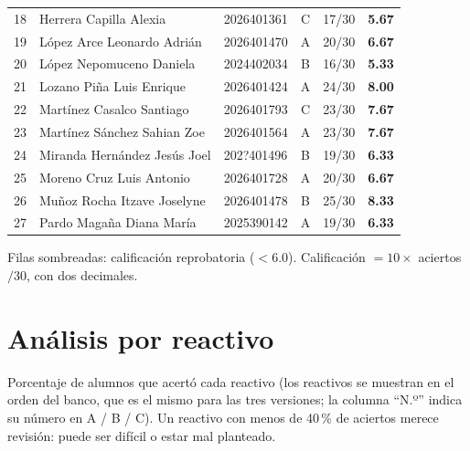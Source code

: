 \documentclass[10pt,letterpaper]{article}
\begin{document}
{\begin{longtable}{@{}r >{\raggedright\arraybackslash}p{7.2cm} l c c c@{}}
\rowcolor{rojo!10}18 & Herrera Capilla Alexia & 2026401361 & C & 17/30 & \textbf{5.67}\\
19 & López Arce Leonardo Adrián & 2026401470 & A & 20/30 & \textbf{6.67}\\
\rowcolor{rojo!10}20 & López Nepomuceno Daniela & 2024402034 & B & 16/30 & \textbf{5.33}\\
21 & Lozano Piña Luis Enrique & 2026401424 & A & 24/30 & \textbf{8.00}\\
22 & Martínez Casalco Santiago & 2026401793 & C & 23/30 & \textbf{7.67}\\
23 & Martínez Sánchez Sahian Zoe & 2026401564 & A & 23/30 & \textbf{7.67}\\
24 & Miranda Hernández Jesús Joel & 202?401496 & B & 19/30 & \textbf{6.33}\\
25 & Moreno Cruz Luis Antonio & 2026401728 & A & 20/30 & \textbf{6.67}\\
26 & Muñoz Rocha Itzave Joselyne & 2026401478 & B & 25/30 & \textbf{8.33}\\
27 & Pardo Magaña Diana María & 2025390142 & A & 19/30 & \textbf{6.33}\\
\end{longtable}}
{\footnotesize Filas sombreadas: calificación reprobatoria ($<6.0$). Calificación $=10\times$ aciertos$/30$, con dos decimales.}
\newpage\section*{Análisis por reactivo}
Porcentaje de alumnos que acertó cada reactivo (los reactivos se muestran en el orden del banco, que es el mismo para las tres versiones; la columna ``N.º'' indica su número en A / B / C). Un reactivo con menos de 40\,\% de aciertos merece revisión: puede ser difícil o estar mal planteado.
\end{document}
